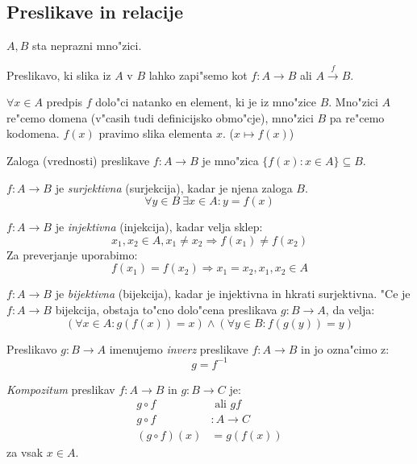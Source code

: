 \subsection{Preslikave in relacije}
$A, B$ sta neprazni mno"zici.

Preslikavo, ki slika iz $A$ v $B$ lahko zapi"semo kot $f: A \rightarrow B$ ali $A \stackrel{f}{\rightarrow} B$.

$\forall x \in A$ predpis $f$ dolo"ci natanko en element, ki je iz mno"zice $B$. Mno"zici $A$ re"cemo domena (v"casih tudi definicijsko obmo"cje), mno"zici $B$ pa re"cemo kodomena. $f(x)$ pravimo slika elementa $x$. ($x \mapsto f(x)$)

Zaloga (vrednosti) preslikave $f: A \rightarrow B$ je mno"zica $\{f(x): x \in A\} \subseteq B$.

$f: A \rightarrow B$ je \emph{surjektivna} (surjekcija), kadar je njena zaloga $B$.
\begin{equation*}
\forall y \in B \ \exists x \in A: y = f(x)
\end{equation*}

$f: A \rightarrow B$ je \emph{injektivna} (injekcija), kadar velja sklep:
\begin{equation*}
x_1, x_2 \in A, x_1 \neq x_2 \Rightarrow f(x_1) \neq f(x_2)
\end{equation*}
Za preverjanje uporabimo:
\begin{equation*}
f(x_1) = f(x_2) \Rightarrow x_1 = x_2, x_1, x_2 \in A
\end{equation*}

$f: A \rightarrow B$ je \emph{bijektivna} (bijekcija), kadar je injektivna in hkrati surjektivna. "Ce je $f: A \rightarrow B$ bijekcija, obstaja to"cno dolo"cena preslikava $g: B \rightarrow A$, da velja:
\begin{equation*}
(\forall x \in A: g(f(x)) = x) \land (\forall y \in B: f(g(y)) = y)
\end{equation*}

Preslikavo $g: B \rightarrow A$ imenujemo \emph{inverz} preslikave $f: A \rightarrow B$ in jo ozna"cimo z:
\begin{equation*}
g = f^{-1}
\end{equation*}

\emph{Kompozitum} preslikav $f: A \rightarrow B$ in $g: B \rightarrow C$ je:
\begin{align*}
g \circ f &\text{ ali } gf\\
g \circ f &: A \rightarrow C\\
(g \circ f)(x) &= g(f(x))
\end{align*}
za vsak $x \in A$.

